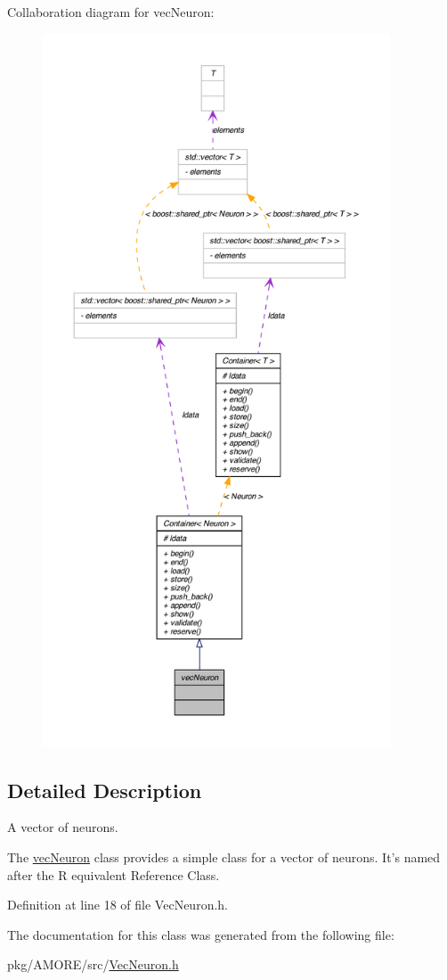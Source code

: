 Collaboration diagram for vecNeuron:\nopagebreak
\begin{figure}[H]
\begin{center}
\leavevmode
\includegraphics[height=600pt]{classvec_neuron__coll__graph}
\end{center}
\end{figure}


\subsection{Detailed Description}
A vector of neurons. 

The \hyperlink{classvec_neuron}{vecNeuron} class provides a simple class for a vector of neurons. It's named after the R equivalent Reference Class. 

Definition at line 18 of file VecNeuron.h.



The documentation for this class was generated from the following file:\begin{DoxyCompactItemize}
\item 
pkg/AMORE/src/\hyperlink{_vec_neuron_8h}{VecNeuron.h}\end{DoxyCompactItemize}
